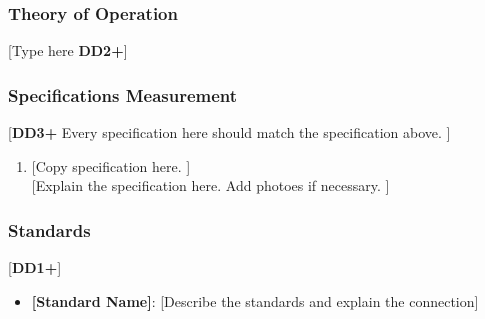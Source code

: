 \subsubsection{Theory of Operation}
[Type here \textbf{DD2+}]

\subsubsection{Specifications Measurement}
[\textbf{DD3+} Every specification here should match the specification above. ]
\begin{enumerate}
    \item {[Copy specification here. ]} \\
          {[Explain the specification here. Add photoes if necessary. ]}
\end{enumerate}

\subsubsection{Standards}
[\textbf{DD1+}]
\begin{itemize}
    \item \textbf{[Standard Name]}: [Describe the standards and explain the connection]
\end{itemize}